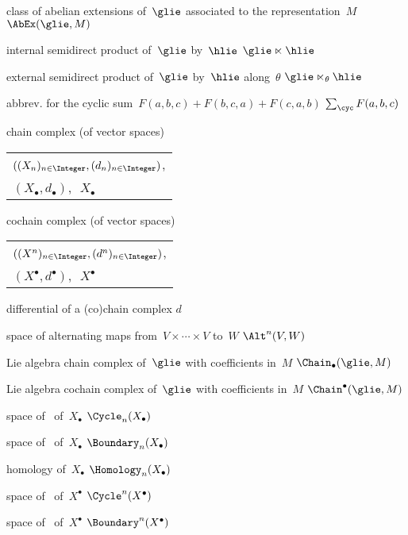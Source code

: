 {class of abelian extensions of~$\glie$ associated to the representation~$M$}
{$\AbEx(\glie, M)$}

{internal semidirect product of~$\glie$ by~$\hlie$}
{$\glie \ltimes \hlie$}

{external semidirect product of~$\glie$ by~$\hlie$ along~$\theta$}
{$\glie \ltimes_\theta \hlie$}

{abbrev. for the cyclic sum~$F(a,b,c) + F(b,c,a) + F(c,a,b)$}
{$\sum_{\cyc} F(a,b,c)$}

{chain complex (of vector spaces)}
{
	\begin{tabular}[t]{@{}l@{}}
		$((X_n)_{n \in \Integer}, (d_n)_{n \in \Integer})$, \\
		$(X_\bullet, d_\bullet)$,\,~$X_\bullet$
	\end{tabular}
}
{cochain complex (of vector spaces)}
{
	\begin{tabular}[t]{@{}l@{}}
		$((X^n)_{n \in \Integer}, (d^n)_{n \in \Integer})$, \\
		$(X^\bullet, d^\bullet)$,\,~$X^\bullet$
	\end{tabular}
}

{differential of a (co)chain complex}
{$d$}

{space of alternating maps from~$V \times \dotsb \times V$ to~$W$}
{$\Alt^n(V,W)$}

{Lie algebra chain complex of~$\glie$ with coefficients in~$M$}
{$\Chain_\bullet(\glie, M)$}

{Lie algebra cochain complex of~$\glie$ with coefficients in~$M$}
{$\Chain^\bullet(\glie, M)$}

{space of~ of~$X_\bullet$}
{$\Cycle_n(X_\bullet)$}

{space of~ of~$X_\bullet$}
{$\Boundary_n(X_\bullet)$}

{ homology of~$X_\bullet$}
{$\Homology_n(X_\bullet)$}

{space of~ of~$X^\bullet$}
{$\Cycle^n(X^\bullet)$}

{space of~ of~$X^\bullet$}
{$\Boundary^n(X^\bullet)$}

